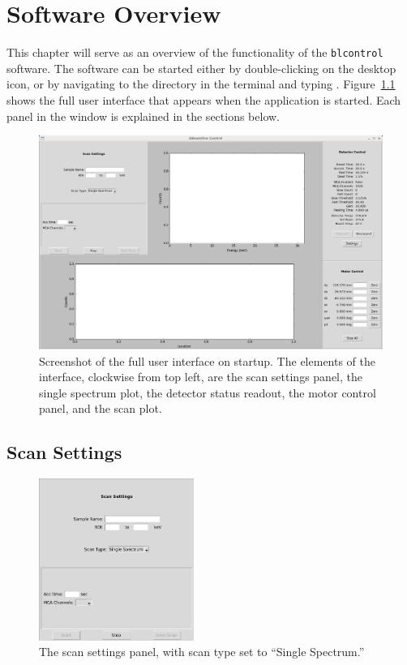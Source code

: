 \chapter{Software Overview\label{sec:software}}

This chapter will serve as an overview of the functionality of the
\texttt{blcontrol} software. The software can be started either by
double-clicking on the desktop icon, or by navigating to the
 directory in the terminal and typing
. Figure~\ref{fig:ui} shows the full user interface that appears
when the application is started. Each panel in the window is explained in the
sections below.

\begin{figure}
\centering \includegraphics[width=\textwidth]{fullui.png}
\caption{\label{fig:ui} Screenshot of the full user interface on startup. The
  elements of the interface, clockwise from top left, are the scan settings
  panel, the single spectrum plot, the detector status readout, the motor
  control panel, and the scan plot.}
\end{figure}

\section{Scan Settings}

\begin{figure}
\centering \includegraphics[width=0.45\textwidth]{scansettings.png}
\caption{\label{fig:scanset} The scan settings panel, with scan type set to
  ``Single Spectrum.''}
\end{figure}

